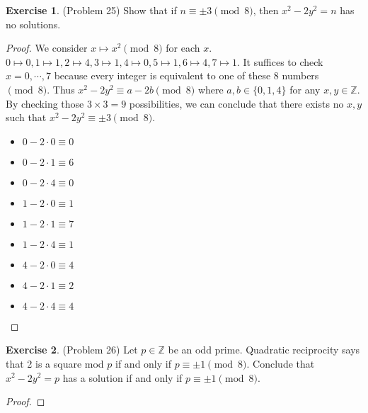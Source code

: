 \documentclass[12pt, psamsfonts]{amsart}
\theoremstyle{definition}
\newtheorem*{exer}{Exercise}
\theoremstyle{remark}
\numberwithin{equation}{section}
\begin{document}
\begin{exer}{(Problem 25)}
  Show that if $n \equiv \pm 3 \pmod 8$, then $x^2 - 2y^2 = n$ has no solutions.
\end{exer}

\begin{proof}
  We consider $x \mapsto x^2 \pmod 8$ for each $x$.
  $0 \mapsto 0, 1 \mapsto 1, 2 \mapsto 4, 3 \mapsto 1, 4 \mapsto 0, 5 \mapsto 1, 6 \mapsto 4, 7 \mapsto 1$.
  It suffices to check $x = 0, \cdots, 7$ because every integer is equivalent to one of these 8 numbers $\pmod 8$.
  Thus $x^2 - 2y^2 \equiv a - 2b \pmod 8$ where $a, b \in \{ 0, 1, 4 \}$ for any $x, y \in \mathbb{Z}$.
  By checking those $3 \times 3 = 9$ possibilities, we can conclude that there exists no $x, y$ such that $x^2 - 2y^2 \equiv \pm 3 \pmod 8$.

  \begin{itemize}
    \item
      $0 - 2 \cdot 0 \equiv 0$
    \item
      $0 - 2 \cdot 1 \equiv 6$
    \item
      $0 - 2 \cdot 4 \equiv 0$
    \item
      $1 - 2 \cdot 0 \equiv 1$
    \item
      $1 - 2 \cdot 1 \equiv 7$
    \item
      $1 - 2 \cdot 4 \equiv 1$
    \item
      $4 - 2 \cdot 0 \equiv 4$
    \item
      $4 - 2 \cdot 1 \equiv 2$
    \item
      $4 - 2 \cdot 4 \equiv 4$
  \end{itemize}
\end{proof}

\begin{exer}{(Problem 26)}
  Let $p \in \mathbb{Z}$ be an odd prime.
  Quadratic reciprocity says that 2 is a square mod $p$ if and only if $p \equiv \pm 1 \pmod 8$.
  Conclude that $x^2 - 2y^2 = p$ has a solution if and only if $p \equiv \pm 1 \pmod 8$.
\end{exer}


\begin{proof}
\end{proof}
\end{document}
